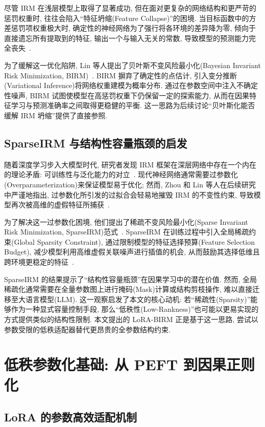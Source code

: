 \documentclass[a4paper,punct=banjiao,twoside]{ctexrep}
\theoremstyle{plain}
\theoremstyle{definition}
\theoremstyle{remark}
\begin{document}
尽管 IRM 在浅层模型上取得了显著成功, 但在面对更复杂的网络结构和更严苛的惩罚权重时, 往往会陷入“特征坍缩(Feature Collapse)”的困境. 当目标函数中的方差惩罚项权重极大时, 确定性的神经网络为了强行将各环境的差异降为零, 倾向于直接遗忘所有提取到的特征, 输出一个与输入无关的常数, 导致模型的预测能力完全丧失~\cite{lin2022bayesian}. 

为了缓解这一优化陷阱, Lin 等人提出了贝叶斯不变风险最小化(Bayesian Invariant Risk Minimization, BIRM)~\cite{lin2022bayesian}. BIRM 摒弃了确定性的点估计, 引入变分推断(Variational Inference)将网络权重建模为概率分布. 通过在参数空间中注入不确定性噪声, BIRM 试图使模型在高惩罚权重下仍保留一定的探索能力, 从而在因果特征学习与预测准确率之间取得更稳健的平衡. 这一思路为后续讨论“贝叶斯化能否缓解 IRM 坍缩”提供了直接参照.

\subsection{SparseIRM 与结构性容量瓶颈的启发}

随着深度学习步入大模型时代, 研究者发现 IRM 框架在深层网络中存在一个内在的理论矛盾: 可训练性与泛化能力的对立~\cite{zhou2022sparse}. 现代神经网络通常需要过参数化(Overparameterization)来保证模型易于优化; 然而, Zhou 和 Lin 等人在后续研究中严谨地指出, 过参数化所引发的过拟合会轻易地摧毁 IRM 的不变性约束, 导致模型再次被高维的虚假特征所捕获~\cite{zhou2022sparse}. 

为了解决这一过参数化困境, 他们提出了稀疏不变风险最小化(Sparse Invariant Risk Minimization, SparseIRM)范式~\cite{zhou2022sparse}. SparseIRM 在训练过程中引入全局稀疏约束(Global Sparsity Constraint), 通过限制模型的特征选择预算(Feature Selection Budget), 减少模型利用高维虚假关联噪声进行插值的机会, 从而鼓励其选择低维且跨环境更稳定的特征~\cite{zhou2022sparse}. 

SparseIRM 的结果提示了“结构性容量瓶颈”在因果学习中的潜在价值. 然而, 全局稀疏化通常需要在全量参数图上进行掩码(Mask)计算或结构剪枝操作, 难以直接迁移至大语言模型(LLM). 这一观察启发了本文的核心动机: 若“稀疏性(Sparsity)”能够作为一种显式容量控制手段, 那么“低秩性(Low-Rankness)”也可能以更易实现的方式提供类似的结构性限制. 本文提出的 LoRA-BIRM 正是基于这一思路, 尝试以参数受限的低秩适配器替代更昂贵的全参数结构约束.

\section{低秩参数化基础: 从 PEFT 到因果正则化}

\subsection{LoRA 的参数高效适配机制}
\end{document}
